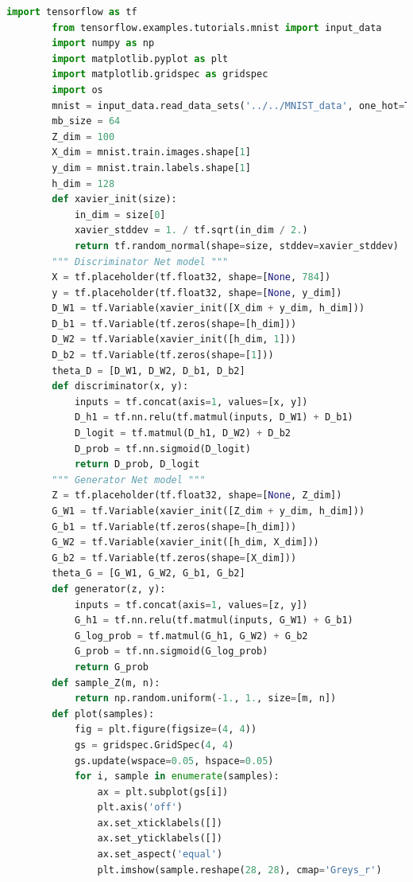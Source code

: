        \begin{lstlisting}[language = Python]
        import tensorflow as tf
        from tensorflow.examples.tutorials.mnist import input_data
        import numpy as np
        import matplotlib.pyplot as plt
        import matplotlib.gridspec as gridspec
        import os
        mnist = input_data.read_data_sets('../../MNIST_data', one_hot=True)
        mb_size = 64
        Z_dim = 100
        X_dim = mnist.train.images.shape[1]
        y_dim = mnist.train.labels.shape[1]
        h_dim = 128
        def xavier_init(size):
            in_dim = size[0]
            xavier_stddev = 1. / tf.sqrt(in_dim / 2.)
            return tf.random_normal(shape=size, stddev=xavier_stddev)
        """ Discriminator Net model """
        X = tf.placeholder(tf.float32, shape=[None, 784])
        y = tf.placeholder(tf.float32, shape=[None, y_dim])
        D_W1 = tf.Variable(xavier_init([X_dim + y_dim, h_dim]))
        D_b1 = tf.Variable(tf.zeros(shape=[h_dim]))
        D_W2 = tf.Variable(xavier_init([h_dim, 1]))
        D_b2 = tf.Variable(tf.zeros(shape=[1]))
        theta_D = [D_W1, D_W2, D_b1, D_b2]
        def discriminator(x, y):
            inputs = tf.concat(axis=1, values=[x, y])
            D_h1 = tf.nn.relu(tf.matmul(inputs, D_W1) + D_b1)
            D_logit = tf.matmul(D_h1, D_W2) + D_b2
            D_prob = tf.nn.sigmoid(D_logit)
            return D_prob, D_logit
        """ Generator Net model """
        Z = tf.placeholder(tf.float32, shape=[None, Z_dim])
        G_W1 = tf.Variable(xavier_init([Z_dim + y_dim, h_dim]))
        G_b1 = tf.Variable(tf.zeros(shape=[h_dim]))
        G_W2 = tf.Variable(xavier_init([h_dim, X_dim]))
        G_b2 = tf.Variable(tf.zeros(shape=[X_dim]))
        theta_G = [G_W1, G_W2, G_b1, G_b2]
        def generator(z, y):
            inputs = tf.concat(axis=1, values=[z, y])
            G_h1 = tf.nn.relu(tf.matmul(inputs, G_W1) + G_b1)
            G_log_prob = tf.matmul(G_h1, G_W2) + G_b2
            G_prob = tf.nn.sigmoid(G_log_prob)
            return G_prob
        def sample_Z(m, n):
            return np.random.uniform(-1., 1., size=[m, n])
        def plot(samples):
            fig = plt.figure(figsize=(4, 4))
            gs = gridspec.GridSpec(4, 4)
            gs.update(wspace=0.05, hspace=0.05)
            for i, sample in enumerate(samples):
                ax = plt.subplot(gs[i])
                plt.axis('off')
                ax.set_xticklabels([])
                ax.set_yticklabels([])
                ax.set_aspect('equal')
                plt.imshow(sample.reshape(28, 28), cmap='Greys_r')

\end{lstlisting}
